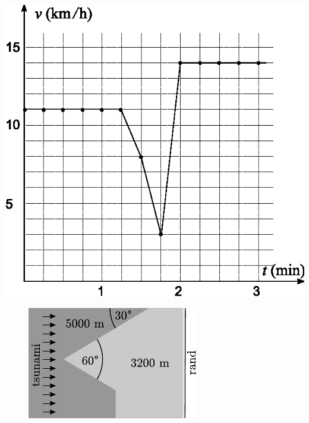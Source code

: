 \documentclass[10pt, twoside]{article}
\begin{document}
{\begin{center}
\includegraphics{2009-v3g-05-gps.eps}
\end{center}
\probend
\bigskip


\begin{figure}
	\begin{center}
		\vspace{-20pt}
		\includegraphics[width=\linewidth]{2005-v3g-06-yl}
	\end{center}
\end{figure}

}
\end{document}
